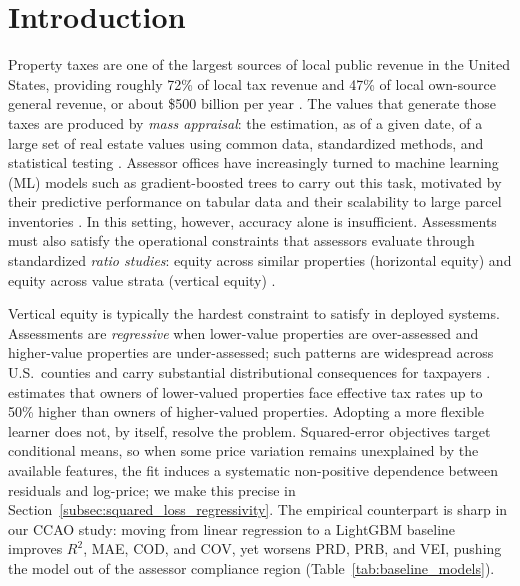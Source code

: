 \documentclass{article}
\theoremstyle{plain}
\theoremstyle{definition}
\newcommand{\1}{\mathbf{1}}
\begin{document}
\section{Introduction}

Property taxes are one of the largest sources of local public revenue in the United States, providing roughly 72\% of local tax revenue and 47\% of local own-source general revenue, or about \$500 billion per year \cite{Berry2021}. The values that generate those taxes are produced by \emph{mass appraisal}: the estimation, as of a given date, of a large set of real estate values using common data, standardized methods, and statistical testing \cite{IAAO2025Mass}. Assessor offices have increasingly turned to machine learning (ML) models such as gradient-boosted trees to carry out this task, motivated by their predictive performance on tabular data and their scalability to large parcel inventories \cite{IAAOAITaskForce2022,BidansetRakow2022,Rootetal2023,Sevgen2024100111,Zilli2024}. In this setting, however, accuracy alone is insufficient. Assessments must also satisfy the operational constraints that assessors evaluate through standardized \emph{ratio studies}: equity across similar properties (horizontal equity) and equity across value strata (vertical equity) \cite{Quintos2014,10578d49-78f8-3ef9-8277-9b6add2bd071,IAAO2013Ratio,IAAO2025ExposureRatio}.

Vertical equity is typically the hardest constraint to satisfy in deployed systems. Assessments are \emph{regressive} when lower-value properties are over-assessed and higher-value properties are under-assessed; such patterns are widespread across U.S.\ counties and carry substantial distributional consequences for taxpayers \cite{McMillen2020,Berry2021,IAAO2023VerticalReview,McMillenSingh2023}. \textcite{amornsiripanitch2020why} estimates that owners of lower-valued properties face effective tax rates up to 50\% higher than owners of higher-valued properties. Adopting a more flexible learner does not, by itself, resolve the problem. Squared-error objectives target conditional means, so when some price variation remains unexplained by the available features, the fit induces a systematic non-positive dependence between residuals and log-price; we make this precise in Section~\ref{subsec:squared_loss_regressivity}. The empirical counterpart is sharp in our CCAO study: moving from linear regression to a LightGBM baseline improves $R^2$, MAE, COD, and COV, yet worsens PRD, PRB, and VEI, pushing the model out of the assessor compliance region (Table~\ref{tab:baseline_models}).
\end{document}
